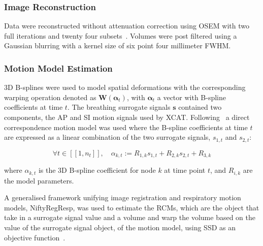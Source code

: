             \subsubsection{Image Reconstruction} \label{impact_of_tof_on_respiratory_motion_modelling_using_nac_pet_methods_image_reconstruction}
                Data were reconstructed without attenuation correction using \gls{OSEM} with two full iterations and twenty four subsets~. Volumes were post filtered using a Gaussian blurring with a kernel size of six point four millimeter \gls{FWHM}.
            
            \subsubsection{Motion Model Estimation} \label{impact_of_tof_on_respiratory_motion_modelling_using_nac_pet_methods_motion_model_estimation}
                3D B-splines were used to model spatial deformations with the corresponding warping operation denoted as $\mathbf{W}(\mathbf{\alpha}_t)$, with $\mathbf{\alpha}_t$ a vector with B-spline coefficients at time $t$. The breathing surrogate signals $\mathbf{s}$ contained two components, the \gls{AP} and \gls{SI} motion signals used by \gls{XCAT}.  Following~ a direct correspondence motion model was used where the B-spline coefficients at time $t$ are expressed as a linear combination of the two surrogate signals, $s_{1,t}$ and $s_{2,t}$:
            
                \begin{equation}
                    \forall t \in [[1,n_t]],\quad \alpha_{k,t} := R_{1,k} s_{1,t} + R_{2,k} s_{2,t} + R_{3,k}
                \end{equation}
                
                \noindent where $\alpha_{k,t}$ is the 3D B-spline coefficient for node $k$ at time point $t$, and $R_{i,k}$ are the model parameters.
            
                A generalised framework unifying image registration and respiratory motion models, NiftyRegResp, was used to estimate the \gls{RCM}s, which are the object that take in a surrogate signal value and a volume and warp the volume based on the value of the surrogate signal object, of the motion model, using \gls{SSD} as an objective function~.
                
